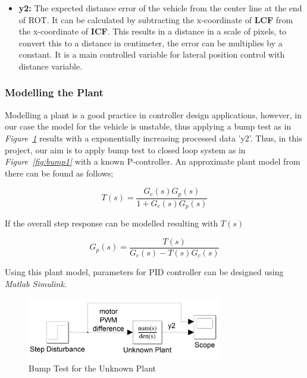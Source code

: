 \documentclass[a4paper,12pt]{article}
\begin{document}
\begin{itemize}[A.]
\begin{itemize}
\item \textbf{y2:} The expected distance error of the vehicle from the center line at the end of ROT. It can be calculated by subtracting the x-coordinate of \textbf{LCF} from the x-coordinate of \textbf{ICF}. This results in a distance in a scale of pixels, to convert this to a distance in centimeter, the error can be multiplies by a constant. It is a main controlled variable for lateral position control with distance variable.



\end{itemize}	 			



\subsubsection*{Modelling the Plant}


Modelling a plant is a good practice in controller design applications, however, in our case the model for the vehicle is unstable, thus applying a bump test as in \textit{Figure~\ref{fig:bump2}} results with a exponentially increasing processed data 'y2'. Thus, in this project, our aim is to apply bump test to closed loop system as in \textit{Figure~\ref{fig:bump1}} with a known P-controller. An approximate plant model from there can be found as follows;


$$ T(s)=\frac{G_c(s)G_p(s)}{1+G_c(s)G_p(s)} $$


If the overall step response can be modelled resulting with $T(s)$


$$\boxed{ G_p(s)=\frac{T(s)}{G_c(s)-T(s)G_c(s)} }$$ 


Using this plant model, parameters for PID controller can be designed using \textit{Matlab Simulink}.


\begin{figure}[h]

\includegraphics[width=0.75\textwidth,center]{images/simulink/modelling2}

\caption{Bump Test for the Unknown Plant \label{fig:bump2} }

\end{figure}



\end{itemize}
\end{document}
